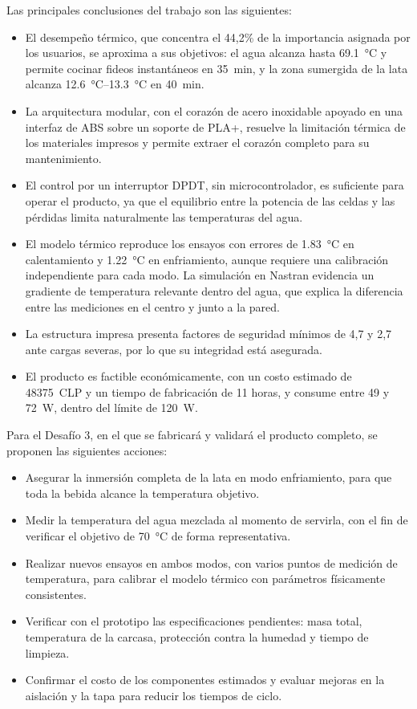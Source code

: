 \documentclass[12pt, a4paper]{article}
\begin{document}
Las principales conclusiones del trabajo son las siguientes:

\begin{itemize}
    \item El desempeño térmico, que concentra el 44,2\% de la importancia asignada por los usuarios, se aproxima a sus objetivos: el agua alcanza hasta \SI{69,1}{\celsius} y permite cocinar fideos instantáneos en \SI{35}{\minute}, y la zona sumergida de la lata alcanza \SIrange{12,6}{13,3}{\celsius} en \SI{40}{\minute}.
    \item La arquitectura modular, con el corazón de acero inoxidable apoyado en una interfaz de ABS sobre un soporte de PLA+, resuelve la limitación térmica de los materiales impresos y permite extraer el corazón completo para su mantenimiento.
    \item El control por un interruptor DPDT, sin microcontrolador, es suficiente para operar el producto, ya que el equilibrio entre la potencia de las celdas y las pérdidas limita naturalmente las temperaturas del agua.
    \item El modelo térmico reproduce los ensayos con errores de \SI{1,83}{\celsius} en calentamiento y \SI{1,22}{\celsius} en enfriamiento, aunque requiere una calibración independiente para cada modo. La simulación en Nastran evidencia un gradiente de temperatura relevante dentro del agua, que explica la diferencia entre las mediciones en el centro y junto a la pared.
    \item La estructura impresa presenta factores de seguridad mínimos de 4,7 y 2,7 ante cargas severas, por lo que su integridad está asegurada.
    \item El producto es factible económicamente, con un costo estimado de \num{48375}~CLP y un tiempo de fabricación de 11 horas, y consume entre 49 y \SI{72}{\watt}, dentro del límite de \SI{120}{\watt}.
\end{itemize}

Para el Desafío 3, en el que se fabricará y validará el producto completo, se proponen las siguientes acciones:

\begin{itemize}
    \item Asegurar la inmersión completa de la lata en modo enfriamiento, para que toda la bebida alcance la temperatura objetivo.
    \item Medir la temperatura del agua mezclada al momento de servirla, con el fin de verificar el objetivo de \SI{70}{\celsius} de forma representativa.
    \item Realizar nuevos ensayos en ambos modos, con varios puntos de medición de temperatura, para calibrar el modelo térmico con parámetros físicamente consistentes.
    \item Verificar con el prototipo las especificaciones pendientes: masa total, temperatura de la carcasa, protección contra la humedad y tiempo de limpieza.
    \item Confirmar el costo de los componentes estimados y evaluar mejoras en la aislación y la tapa para reducir los tiempos de ciclo.
\end{itemize}
\end{document}
